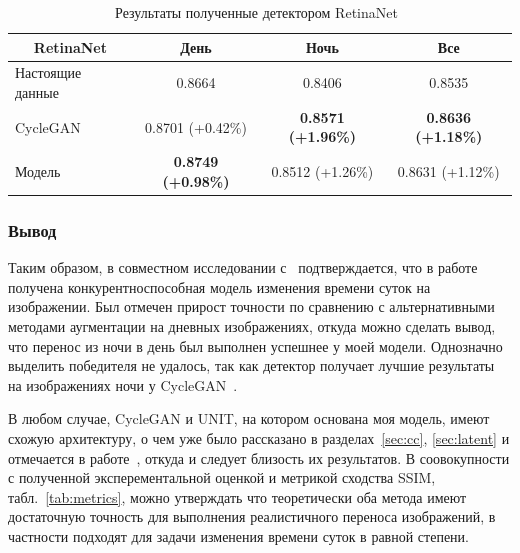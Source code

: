 \documentclass[11pt,a4paper]{extarticle}
\begin{document}
{			\begin{table}[ht]
				\centering
				\begin{tabular}{|l|c|c|c|}
				\hline
				\multicolumn{1}{|c|}{{\color[HTML]{9A0000} \textbf{RetinaNet}}} & \textbf{День}   & \textbf{Ночь}   & \textbf{Все}    \\ \hline
				Настоящие данные                                                & 0.8664          & 0.8406          & 0.8535          \\ \hline
				CycleGAN                                                        & 0.8701 (+0.42\%)           & \textbf{0.8571 (+1.96\%)} & \textbf{0.8636 (+1.18\%)} \\ \hline
				Модель                                                          & \textbf{0.8749 (+0.98\%)}  & 0.8512 (+1.26\%)          & 0.8631 (+1.12\%)          \\ \hline
				\end{tabular}
				\caption{Результаты полученные детектором RetinaNet~\cite{disser_aug}}
				\label{tab:aug}
			\end{table}
			
			\vspace{-2em}
			\subsubsection*{Вывод}
			
				Таким образом, в совместном исследовании с~\cite{disser_aug} подтверждается, что в работе получена конкурентноспособная модель изменения времени суток на изображении.
				Был отмечен прирост точности по сравнению с альтернативными методами аугментации на дневных изображениях, откуда можно сделать вывод, что перенос из ночи в день был выполнен успешнее у моей модели.
				Однозначно выделить победителя не удалось, так как детектор получает лучшие результаты на изображениях ночи у CycleGAN~\cite{CycleGAN}.
				
				В любом случае, CycleGAN и UNIT, на котором основана моя модель, имеют схожую архитектуру, о чем уже было рассказано в разделах~\ref{sec:cc}, \ref{sec:latent} и отмечается в работе~\cite{UNIT_vs_CycleGAN}, откуда и следует близость их результатов.
				В соовокупности с полученной эксперементальной оценкой и метрикой сходства SSIM, табл.~\ref{tab:metrics}, можно утверждать что теоретически оба метода имеют достаточную точность для выполнения реалистичного переноса изображений, в частности подходят для задачи изменения времени суток в равной степени.
				
}
\end{document}

